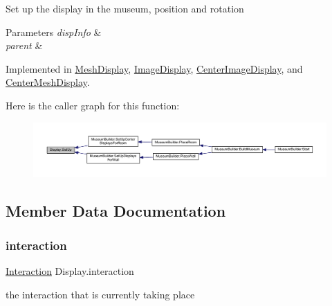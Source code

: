 Set up the display in the museum, position and rotation 


\begin{DoxyParams}{Parameters}
{\em disp\+Info} & \\
\hline
{\em parent} & \\
\hline
\end{DoxyParams}


Implemented in \mbox{\hyperlink{class_mesh_display_adb19ca4d076a93df64d1c035663fce0f}{Mesh\+Display}}, \mbox{\hyperlink{class_image_display_a28fead7caeeb12490d26fae943da6a1e}{Image\+Display}}, \mbox{\hyperlink{class_center_image_display_a3da996020c7d8abcd24f35660945703a}{Center\+Image\+Display}}, and \mbox{\hyperlink{class_center_mesh_display_a9d14ccee557aa886938d1d86ee016930}{Center\+Mesh\+Display}}.

Here is the caller graph for this function\+:
\nopagebreak
\begin{figure}[H]
\begin{center}
\leavevmode
\includegraphics[width=350pt]{class_display_a57325251fbeac943cd48520e50f0bec4_icgraph}
\end{center}
\end{figure}


\subsection{Member Data Documentation}
\mbox{\label{class_display_af35594f083ed6dd4279183215719583f}} 
\subsubsection{\texorpdfstring{interaction}{interaction}}
{\footnotesize\ttfamily \mbox{\hyperlink{class_interaction}{Interaction}} Display.\+interaction\hspace{0.3cm}{\ttfamily [private]}}



the interaction that is currently taking place 

\mbox{\label{class_display_aab913d6cfa4e9631e8129ed131e79196}} 
